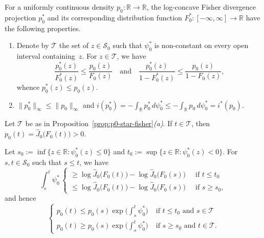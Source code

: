 \documentclass[10pt,a4paper]{amsart}
\newcommand{\R}{\mathbb{R}}
\newcommand{\norm}[1]{\|{#1}\|}
\begin{document}
\begin{proposition}
\label{prop:p0-star-fisher}
For a uniformly continuous density $p_0 \colon \R \to \R$, the log-concave Fisher divergence projection $p_0^*$ and its corresponding distribution function $F_0^* \colon [-\infty,\infty] \to \R$ have the following properties.
\begin{enumerate}[label=(\alph*)]
\item Denote by $\mathcal{T}$ the set of $z \in \mathcal{S}_0$ such that $\psi_0^*$ is non-constant on every open interval containing~$z$. 
For $z \in \mathcal{T}$, we have
\begin{equation}
\label{eq:p0-star-hazard}
\frac{p_0^*(z)}{F_0^*(z)} \leq \frac{p_0(z)}{F_0(z)} \quad\text{and}\quad \frac{p_0^*(z)}{1 - F_0^*(z)} \leq \frac{p_0(z)}{1 - F_0(z)},
\end{equation}
whence $p_0^*(z) \leq p_0(z)$.
\item $\norm{p_0^*}_\infty \leq \norm{p_0}_\infty$ and $i(p_0^*) = -\int_\R p_0^*\,d\psi_0^* \leq -\int_\R p_0\,d\psi_0^* = i^*(p_0)$.
\end{enumerate}
\end{proposition}

\begin{lemma}
\label{lem:J0-J0hat}
Let $\mathcal{T}$ be as in Proposition~\ref{prop:p0-star-fisher}\textit{(a)}. If $t \in \mathcal{T}$, then $p_0(t) = \hat{J}_0\bigl(F_0(t)\bigr) > 0$. 
\end{lemma}

\begin{lemma}
\label{lem:p0-psi0-ineq}
Let $s_0 := \inf\{z \in \R : \psi_0^*(z) \leq 0\}$ and $t_0 := \sup\{z \in \R : \psi_0^*(z) < 0\}$. For $s,t \in \mathcal{S}_0$ such that $s \leq t$, we have
\begin{equation}
\label{eq:psi0-int-integral}
\int_s^t \psi_0^* \,
\begin{cases}
\geq \log\hat{J}_0\bigl(F_0(t)\bigr) - \log\hat{J}_0\bigl(F_0(s)\bigr) \;\;&\text{if }t \leq t_0 \\
\leq \log\hat{J}_0\bigl(F_0(t)\bigr) - \log\hat{J}_0\bigl(F_0(s)\bigr)  \;\;&\text{if }s \geq s_0,
\end{cases}
\end{equation}
and hence
\begin{equation}
\label{eq:p0-psi0-ineq}
\begin{cases}
p_0(t) \leq p_0(s)\exp\bigl(\int_s^t \psi_0^*\bigr) \;&\text{if }t \leq t_0 \text{ and }s \in \mathcal{T} \\
p_0(t) \geq p_0(s)\exp\bigl(\int_s^t \psi_0^*\bigr) \;&\text{if }s \geq s_0 \text{ and }t \in \mathcal{T}.
\end{cases}
\end{equation}
\end{lemma}
\end{document}
